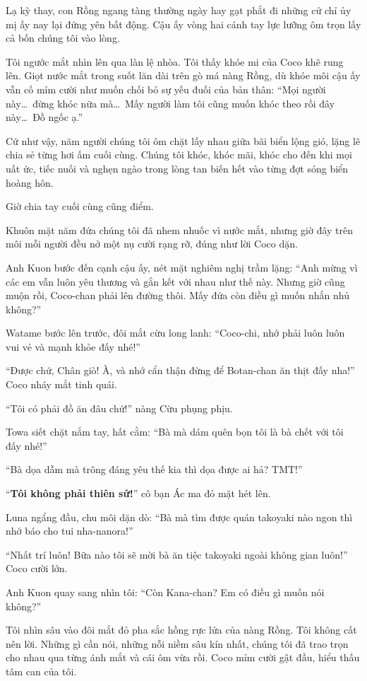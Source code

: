 \documentclass[../main.tex]{subfiles}
\begin{document}
Lạ kỳ thay, con Rồng ngang tàng thường ngày hay gạt phắt đi những cử chỉ ủy mị ấy nay lại đứng yên bất động. Cậu ấy vòng hai cánh tay lực lưỡng ôm trọn lấy cả bốn chúng tôi vào lòng.

Tôi ngước mắt nhìn lên qua làn lệ nhòa. Tôi thấy khóe mi của Coco khẽ rung lên. Giọt nước mắt trong suốt lăn dài trên gò má nàng Rồng, dù khóe môi cậu ấy vẫn cố mỉm cười như muốn chối bỏ sự yếu đuối của bản thân: ``Mọi người này\dots\ đừng khóc nữa mà\dots\ Mấy người làm tôi cũng muốn khóc theo rồi đây này\dots\ Đồ ngốc ạ.''

Cứ như vậy, năm người chúng tôi ôm chặt lấy nhau giữa bãi biển lộng gió, lặng lẽ chia sẻ từng hơi ấm cuối cùng. Chúng tôi khóc, khóc mãi, khóc cho đến khi mọi uất ức, tiếc nuối và nghẹn ngào trong lòng tan biến hết vào từng đợt sóng biển hoàng hôn.

\ct

Giờ chia tay cuối cùng cũng điểm.

Khuôn mặt năm đứa chúng tôi đã nhem nhuốc vì nước mắt, nhưng giờ đây trên môi mỗi người đều nở một nụ cười rạng rỡ, đúng như lời Coco dặn.

Anh Kuon bước đến cạnh cậu ấy, nét mặt nghiêm nghị trầm lặng: ``Anh mừng vì các em vẫn luôn yêu thương và gắn kết với nhau như thế này. Nhưng giờ cũng muộn rồi, Coco-chan phải lên đường thôi. Mấy đứa còn điều gì muốn nhắn nhủ không?''

Watame bước lên trước, đôi mắt cừu long lanh: ``Coco-chi, nhớ phải luôn luôn vui vẻ và mạnh khỏe đấy nhé!''

``Được chứ, Chân giò! À, và nhớ cẩn thận đừng để Botan-chan ăn thịt đấy nha!'' Coco nháy mắt tinh quái.

``Tôi có phải đồ ăn đâu chứ!'' nàng Cừu phụng phịu.

Towa siết chặt nắm tay, hất cằm: ``Bà mà dám quên bọn tôi là bà chết với tôi đấy nhé!''

``Bà dọa dẫm mà trông đáng yêu thế kia thì dọa được ai hả? TMT!''

``\textbf{Tôi không phải thiên sứ!}'' cô bạn Ác ma đỏ mặt hét lên.

Luna ngẩng đầu, chu môi dặn dò: ``Bà mà tìm được quán takoyaki nào ngon thì nhớ báo cho tui nha-nanora!''

``Nhất trí luôn! Bữa nào tôi sẽ mời bà ăn tiệc takoyaki ngoài không gian luôn!'' Coco cười lớn.

Anh Kuon quay sang nhìn tôi: ``Còn Kana-chan? Em có điều gì muốn nói không?''

Tôi nhìn sâu vào đôi mắt đỏ pha sắc hồng rực lửa của nàng Rồng. Tôi không cất nên lời. Những gì cần nói, những nỗi niềm sâu kín nhất, chúng tôi đã trao trọn cho nhau qua từng ánh mắt và cái ôm vừa rồi. Coco mỉm cười gật đầu, hiểu thấu tâm can của tôi.
\end{document}

